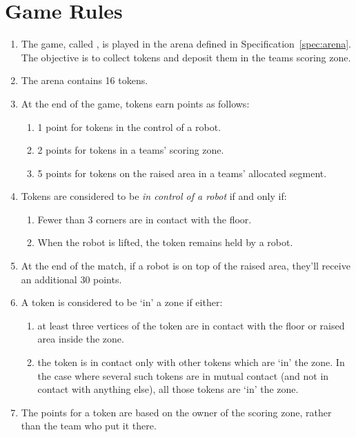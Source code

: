 \section{Game Rules}
\label{sec:rules}

\begin{enumerate}
  \item The game, called \emph{\gamename}, is played in the arena defined in
        Specification~\ref{spec:arena}. The objective is to collect tokens and
        deposit them in the teams scoring zone.
  \item The arena contains 16 tokens.
  \item At the end of the game, tokens earn points as follows:
    \begin{enumerate}
      \item 1 point for tokens in the control of a robot.
      \item 2 points for tokens in a teams' scoring zone.
      \item 5 points for tokens on the raised area in a teams' allocated segment.
    \end{enumerate}
  \item Tokens are considered to be \textit{in control of a robot} if and only if:
    \begin{enumerate}
      \item Fewer than 3 corners are in contact with the floor.
      \item When the robot is lifted, the token remains held by a robot.
    \end{enumerate}
  \item At the end of the match, if a robot is on top of the raised area, they'll
        receive an additional 30 points.
  \item A token is considered to be `in' a zone if either:
    \begin{enumerate}
      \item at least three vertices of the token are in contact with the floor or
            raised area inside the zone.
      \item the token is in contact only with other tokens which are `in' the zone.
            In the case where several such tokens are in mutual contact (and not in
            contact with anything else), all those tokens are `in' the zone.
    \end{enumerate}
  \item The points for a token are based on the owner of the scoring zone, rather than
        the team who put it there.

\end{enumerate}

